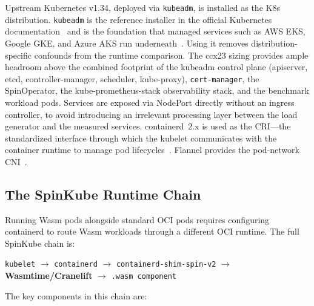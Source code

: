 \begin{sloppypar}
Upstream Kubernetes v1.34, deployed via \texttt{kubeadm}, is installed as the \acs{K8s} distribution. \texttt{kubeadm} is the reference installer in the official Kubernetes documentation~\cite{k8s2024architecture} and is the foundation that managed services such as \acs{AWS} \acs{EKS}, Google \acs{GKE}, and Azure \acs{AKS} run underneath~\cite{k8s2024architecture}. Using it removes distribution-specific confounds from the runtime comparison. The ccx23 sizing provides ample headroom above the combined footprint of the kubeadm control plane (apiserver, etcd, controller-manager, scheduler, kube-proxy), \texttt{cert-manager}, the SpinOperator, the kube-prometheus-stack observability stack, and the benchmark workload pods. Services are exposed via NodePort directly without an ingress controller, to avoid introducing an irrelevant processing layer between the load generator and the measured services. containerd~2.x is used as the \ac{CRI}---the standardized interface through which the kubelet communicates with the container runtime to manage pod lifecycles~\cite{k8s2024architecture, runwasi2024}. Flannel provides the pod-network \acs{CNI}~\cite{flannel2024}.
\end{sloppypar}

\subsection{The SpinKube Runtime Chain}

Running \acs{Wasm} pods alongside standard \acs{OCI} pods requires configuring containerd to route \acs{Wasm} workloads through a different \acs{OCI} runtime. The full SpinKube chain is:

\begin{center}
\begin{sloppypar}
\texttt{kubelet} $\to$ \texttt{containerd} $\to$ \texttt{containerd-shim-spin-v2} $\to$ \textbf{Wasmtime/Cranelift} $\to$ \texttt{.wasm component}
\end{sloppypar}
\end{center}

The key components in this chain are:

